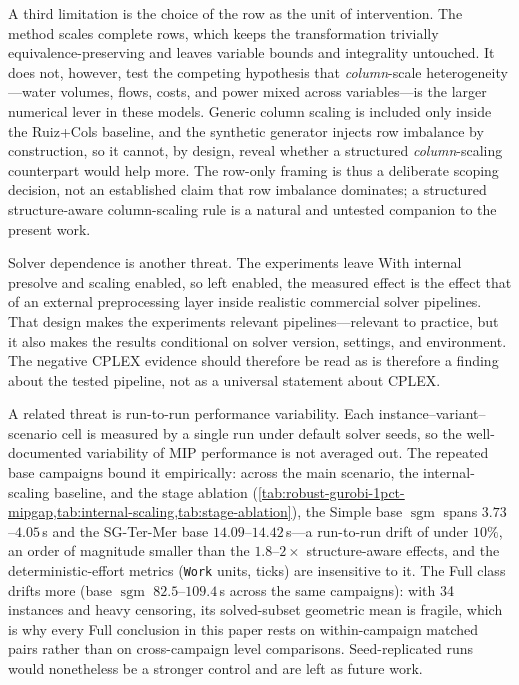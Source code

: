 \documentclass[AMA,Times1COL]{WileyNJDv5} %
\newcommand{\methodRuizCols}{Ruiz+Cols}
\newcommand{\sgm}{\ensuremath{\operatorname{sgm}}}
\newcommand{\Work}{\texttt{Work}}
\providecommand{\DIFadd}[1]{{\protect\color{blue} \sf #1}} %
\providecommand{\DIFdel}[1]{{\protect\color{red} \scriptsize #1}} %
\providecommand{\DIFaddbegin}{} %
\providecommand{\DIFaddend}{} %
\providecommand{\DIFdelbegin}{} %
\providecommand{\DIFdelend}{} %
\begin{document}
\DIFadd{A third limitation is the choice of the row as the unit of intervention. The method scales
complete rows, which keeps the transformation trivially equivalence-preserving and leaves
variable bounds and integrality untouched. It does not, however, test the competing
hypothesis that \emph{column}-scale heterogeneity---water volumes, flows, costs, and power
mixed across variables---is the larger numerical lever in these models. Generic
column scaling is included only inside the \methodRuizCols{} baseline, and the synthetic
generator injects row imbalance by construction, so it cannot, by design, reveal whether a
structured \emph{column}-scaling counterpart would help more. The row-only framing is thus a
deliberate scoping decision, not an established claim that row imbalance dominates; a
structured structure-aware column-scaling rule is a natural and untested companion to the
present work}\DIFaddend .

Solver dependence is another threat. \DIFdelbegin \DIFdel{The experiments leave }\DIFdelend \DIFaddbegin \DIFadd{With }\DIFaddend internal presolve and scaling \DIFdelbegin \DIFdel{enabled, so }\DIFdelend \DIFaddbegin \DIFadd{left enabled, }\DIFaddend the
measured effect is \DIFdelbegin \DIFdel{the effect }\DIFdelend \DIFaddbegin \DIFadd{that }\DIFaddend of an external \DIFdelbegin \DIFdel{preprocessing }\DIFdelend layer inside realistic commercial \DIFdelbegin \DIFdel{solver pipelines. That design makes the experiments relevant
}\DIFdelend \DIFaddbegin \DIFadd{pipelines---relevant }\DIFaddend to
practice, but \DIFdelbegin \DIFdel{it also makes the results }\DIFdelend conditional on solver version, settings, and environment. The negative CPLEX
evidence \DIFdelbegin \DIFdel{should therefore be read as }\DIFdelend \DIFaddbegin \DIFadd{is therefore }\DIFaddend a finding about the tested pipeline, not \DIFdelbegin \DIFdel{as }\DIFdelend a universal statement about CPLEX.

\DIFaddbegin \DIFadd{A related threat is run-to-run performance variability. Each instance--variant--scenario cell
is measured by a single run under default solver seeds, so the well-documented variability of
MIP performance is not averaged out. The repeated base campaigns bound it empirically: across
the main scenario, the internal-scaling baseline, and the stage ablation
(\cref{tab:robust-gurobi-1pct-mipgap,tab:internal-scaling,tab:stage-ablation}), the Simple base
$\sgm$ spans $3.73$--$4.05$\,s and the SG-Ter-Mer base $14.09$--$14.42$\,s---a run-to-run drift
of under $10\%$, an order of magnitude smaller than the $1.8$--$2\times$ structure-aware
effects, and the deterministic-effort metrics (\Work{} units, ticks) are insensitive to it.
The Full class drifts more (base $\sgm$ $82.5$--$109.4$\,s across the same campaigns): with
34 instances and heavy censoring, its solved-subset geometric mean is fragile, which is why
every Full conclusion in this paper rests on within-campaign matched pairs rather than on
cross-campaign level comparisons.
Seed-replicated runs would nonetheless be a stronger control and are left as future work.
}
\end{document}
